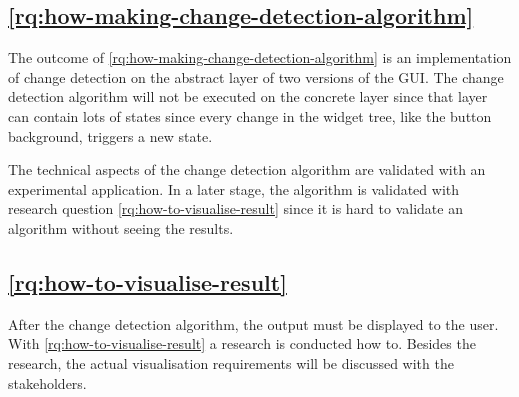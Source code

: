 \subsection{\ref{rq:how-making-change-detection-algorithm} \rqHowMakingChangeDetectionAlgorithm}

The outcome of \ref{rq:how-making-change-detection-algorithm} is an implementation of change detection on the abstract layer of two versions of the GUI. The change detection algorithm will not be executed on the concrete layer since that layer can contain lots of states since every change in the widget tree, like the button background, triggers a new state. 

The technical aspects of the change detection algorithm are validated with an experimental application. In a later stage, the algorithm is validated with research question \ref{rq:how-to-visualise-result} since it is hard to validate an algorithm without seeing the results. 

\subsection{\ref{rq:how-to-visualise-result} \rqHowToVisualiseResult}

After the change detection algorithm, the output must be displayed to the user. With \ref{rq:how-to-visualise-result} a research is conducted how to. Besides the research, the actual visualisation requirements will be discussed with the \testar stakeholders.